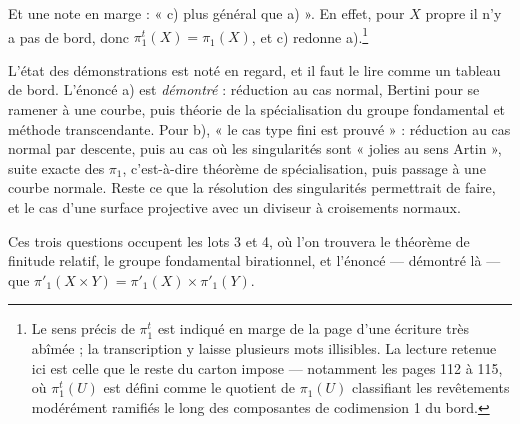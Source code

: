 \documentclass[11pt,a4paper]{article}
\begin{document}
Et une note en marge : « c) plus général que a) ». En effet, pour $X$ propre il
n'y a pas de bord, donc $\pi^{t}_{1}(X) = \pi_{1}(X)$, et c) redonne
a).\footnote{Le sens précis de $\pi_{1}^{t}$ est indiqué en marge de la page
d'une écriture très abîmée ; la transcription y laisse plusieurs mots
illisibles. La lecture retenue ici est celle que le reste du carton impose ---
notamment les pages 112 à 115, où $\pi_{1}^{t}(U)$ est défini comme le quotient
de $\pi_{1}(U)$ classifiant les revêtements modérément ramifiés le long des
composantes de codimension 1 du bord.}

L'état des démonstrations est noté en regard, et il faut le lire comme un
tableau de bord. L'énoncé a) est \emph{démontré} : réduction au cas normal,
Bertini pour se ramener à une courbe, puis théorie de la spécialisation du
groupe fondamental et méthode transcendante. Pour b), « le cas type fini est
prouvé » : réduction au cas normal par descente, puis au cas où les
singularités sont « jolies au sens Artin », suite exacte des $\pi_{1}$,
c'est-à-dire théorème de spécialisation, puis passage à une courbe normale.
Reste ce que la résolution des singularités permettrait de faire, et le cas
d'une surface projective avec un diviseur à croisements normaux.

Ces trois questions occupent les lots 3 et 4, où l'on trouvera le théorème de
finitude relatif, le groupe fondamental birationnel, et l'énoncé --- démontré
là --- que $\pi'_{1}(X \times Y) = \pi'_{1}(X) \times \pi'_{1}(Y)$.
\end{document}

